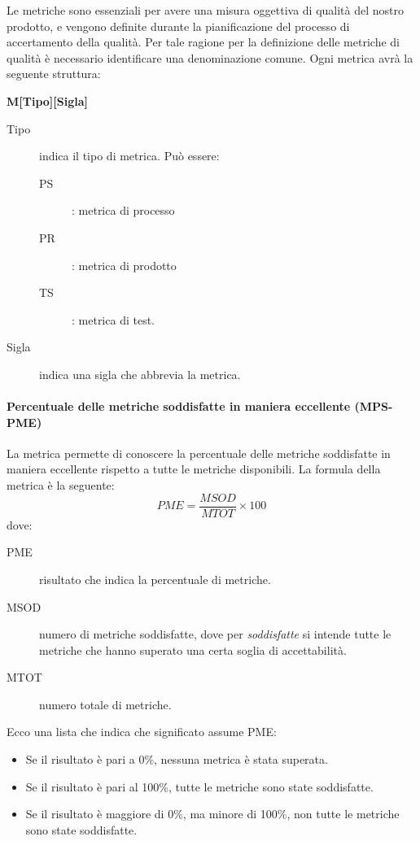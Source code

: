 \documentclass[../../norme-di-progetto.tex]{subfiles}
\begin{document}
Le metriche sono essenziali per avere una misura oggettiva di qualità del nostro prodotto, e vengono definite durante la pianificazione del processo di accertamento della qualità.
Per tale ragione per la definizione delle metriche di qualità è necessario identificare una denominazione comune.
Ogni metrica avrà la seguente struttura:
\begin{center}
  \textbf{M[Tipo][Sigla]}
\end{center}
\begin{description}
  \item [Tipo] indica il tipo di metrica. Può essere:
        \begin{description}
          \item[PS]: metrica di processo
          \item[PR]: metrica di prodotto
          \item[TS]: metrica di test.
        \end{description}
  \item [Sigla] indica una sigla che abbrevia la metrica.
\end{description}

\paragraph{Percentuale delle metriche soddisfatte in maniera eccellente (MPS-PME)}%
\label{par:percentuale_delle_metriche_soddisfatte_in_maniera_eccellente}

La metrica permette di conoscere la percentuale delle metriche soddisfatte in maniera eccellente rispetto a tutte le metriche  disponibili.
La formula della metrica è la seguente:
\[
  PME = \frac{MSOD}{MTOT} \times 100
\]
dove:
\begin{description}
  \item[PME] risultato che indica la percentuale di metriche.
  \item[MSOD] numero di metriche soddisfatte, dove per \textit{soddisfatte} si intende tutte le metriche che hanno superato una certa soglia di accettabilità.
  \item[MTOT] numero totale di metriche.
\end{description}

Ecco una lista che indica che significato assume PME\@:
\begin{itemize}
  \item Se il risultato è pari a 0\%, nessuna metrica è stata superata.
  \item Se il risultato è pari al 100\%, tutte le metriche sono state soddisfatte.
  \item Se il risultato è maggiore di 0\%, ma minore di 100\%, non tutte le metriche sono state soddisfatte.
\end{itemize}


\end{document}
